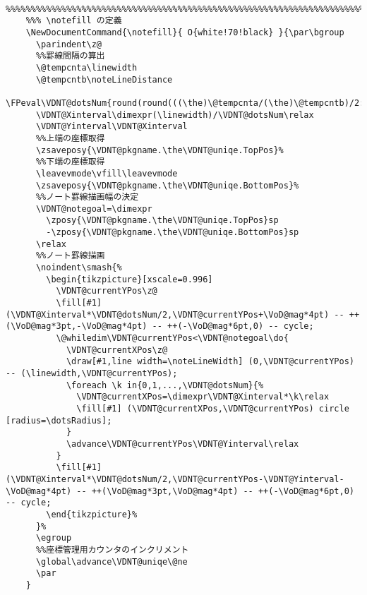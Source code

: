 \documentclass[a4paper,12pt]{article}
\begin{document}
\begin{lstlisting}
    %%%%%%%%%%%%%%%%%%%%%%%%%%%%%%%%%%%%%%%%%%%%%%%%%%%%%%%%%%%%%%%%%%%%%%%%%%%%%%%%%%%%%%%%%
    %%% \notefill の定義
    \NewDocumentCommand{\notefill}{ O{white!70!black} }{\par\bgroup
      \parindent\z@
      %%罫線間隔の算出
      \@tempcnta\linewidth
      \@tempcntb\noteLineDistance
      \FPeval\VDNT@dotsNum{round(round(((\the)\@tempcnta/(\the)\@tempcntb)/2:0)*2:0)}%
      \VDNT@Xinterval\dimexpr(\linewidth)/\VDNT@dotsNum\relax
      \VDNT@Yinterval\VDNT@Xinterval
      %%上端の座標取得
      \zsaveposy{\VDNT@pkgname.\the\VDNT@uniqe.TopPos}%
      %%下端の座標取得
      \leavevmode\vfill\leavevmode
      \zsaveposy{\VDNT@pkgname.\the\VDNT@uniqe.BottomPos}%
      %%ノート罫線描画幅の決定
      \VDNT@notegoal=\dimexpr
        \zposy{\VDNT@pkgname.\the\VDNT@uniqe.TopPos}sp
        -\zposy{\VDNT@pkgname.\the\VDNT@uniqe.BottomPos}sp
      \relax
      %%ノート罫線描画
      \noindent\smash{%
        \begin{tikzpicture}[xscale=0.996]
          \VDNT@currentYPos\z@
          \fill[#1] (\VDNT@Xinterval*\VDNT@dotsNum/2,\VDNT@currentYPos+\VoD@mag*4pt) -- ++(\VoD@mag*3pt,-\VoD@mag*4pt) -- ++(-\VoD@mag*6pt,0) -- cycle;
          \@whiledim\VDNT@currentYPos<\VDNT@notegoal\do{
            \VDNT@currentXPos\z@
            \draw[#1,line width=\noteLineWidth] (0,\VDNT@currentYPos) -- (\linewidth,\VDNT@currentYPos);
            \foreach \k in{0,1,...,\VDNT@dotsNum}{%
              \VDNT@currentXPos=\dimexpr\VDNT@Xinterval*\k\relax
              \fill[#1] (\VDNT@currentXPos,\VDNT@currentYPos) circle [radius=\dotsRadius];
            }
            \advance\VDNT@currentYPos\VDNT@Yinterval\relax
          }
          \fill[#1] (\VDNT@Xinterval*\VDNT@dotsNum/2,\VDNT@currentYPos-\VDNT@Yinterval-\VoD@mag*4pt) -- ++(\VoD@mag*3pt,\VoD@mag*4pt) -- ++(-\VoD@mag*6pt,0) -- cycle;
        \end{tikzpicture}%
      }%
      \egroup
      %%座標管理用カウンタのインクリメント
      \global\advance\VDNT@uniqe\@ne
      \par
    }



\end{lstlisting}
\end{document}
